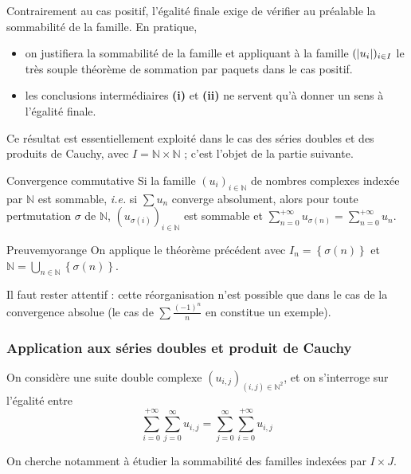     Contrairement au cas positif, l’égalité finale exige de vérifier au préalable la sommabilité de la famille. En pratique, \begin{itemize}
        \item on justifiera la sommabilité de la famille et appliquant à  la famille $(\left\lvert u_i\right\rvert)_{i \in I}$ le très souple théorème de sommation par paquets dans le cas positif.
        \item les conclusions intermédiaires \textbf{(i)} et \textbf{(ii)} ne servent qu’à donner un sens à l’égalité finale. 
    \end{itemize}

    Ce résultat est essentiellement exploité dans le cas des séries doubles et des produits de Cauchy, avec $I = \mathbb{N} \times \mathbb{N}$ ; c’est l’objet de la partie suivante. 

    \begin{coro}{Convergence commutative}{}
        Si la famille $(u_i)_{i \in \mathbb{N}}$ de nombres complexes indexée par $\mathbb{N}$ est sommable, \textit{i.e.} si $\sum u_n$ converge absolument, alors pour toute pertmutation $\sigma$ de $\mathbb{N}$, $(u_{\sigma(i)})_{i \in \mathbb{N}}$ est sommable et $\sum_{n = 0}^{+\infty} u_{\sigma(n)} = \sum_{n = 0}^{+\infty} u_n$.
    \end{coro}

    \begin{omed}{Preuve}{myorange}
        On applique le théorème précédent avec $I_n = \left\{\sigma(n)\right\}$ et $\mathbb{N} = \bigcup_{n \in \mathbb{N}} \left\{\sigma(n)\right\}$.
    \end{omed}

    Il faut rester attentif : cette réorganisation n’est possible que dans le cas de la convergence absolue (le cas de $\sum \frac{(-1)^n}{n}$ en constitue un exemple).

    \subsubsection{Application aux séries doubles et produit de Cauchy}

    On considère une suite double complexe $(u_{i,j})_{(i,j) \in \mathbb{N}^2}$, et on s’interroge sur l’égalité entre 
    \[ \sum_{i = 0}^{+\infty} \sum_{j = 0}^{\infty} u_{i,j} = \sum_{j = 0}^{\infty} \sum_{i=0}^{+\infty} u_{i,j} \]    

    On cherche notamment à étudier la sommabilité des familles indexées par $I \times J$.

